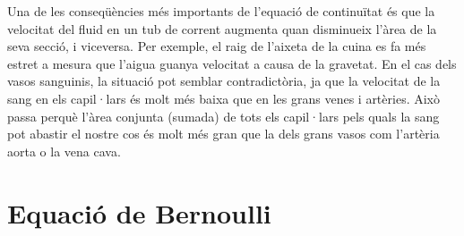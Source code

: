 \documentclass[12pt]{book}
\begin{document}
%
Una de les conseqüències més importants de l'equació de continuïtat és que la velocitat del fluid en un tub de corrent augmenta quan disminueix l'àrea de la seva secció, i viceversa. Per exemple, el raig de l'aixeta de la cuina es fa més estret a mesura que l'aigua guanya velocitat a causa de la gravetat. En el cas dels vasos sanguinis, la situació pot semblar contradictòria, ja que la velocitat de la sang en els capil·lars és molt més baixa que en les grans venes i artèries. Això passa perquè l'àrea conjunta (sumada) de tots els capil·lars pels quals la sang pot abastir el nostre cos és molt més gran que la dels grans vasos com l'artèria aorta o la vena cava.

\section{Equació de Bernoulli}
\end{document}
